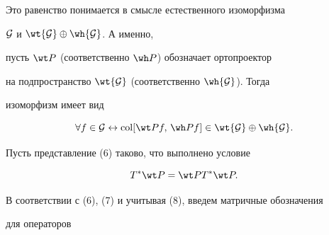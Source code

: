 Это равенство понимается в смысле естественного изоморфизма


${\cal G}$ и $\wt {\cal G} \oplus \wh {\cal G}$. А именно,


пусть $\wt P$ (соответственно $\wh P$) обозначает ортопроектор


на подпространство $\wt {\cal G}$ (соответственно $\wh {\cal G}$). Тогда


изоморфизм имеет вид


\begin{equation}


\forall f \in {\cal G} \leftrightarrow


\col [\wt P f,\, \wh P f]


\in \wt {\cal G} \oplus \wh {\cal G}.


\end{equation}





Пусть представление (6) таково, что выполнено условие


\begin{equation}


T^*\wt P = \wt P T^* \wt P.


\end{equation}





В соответствии с (6), (7) и учитывая (8), введем матричные обозначения


для операторов


